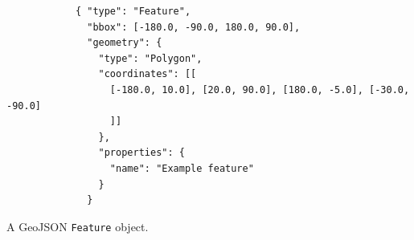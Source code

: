 \begin{listing}[ht]\centering
  \begin{minipage}{.8\textwidth}
    \begin{verbatim}
	        { "type": "Feature",
	          "bbox": [-180.0, -90.0, 180.0, 90.0],
	          "geometry": {
	            "type": "Polygon",
	            "coordinates": [[
	              [-180.0, 10.0], [20.0, 90.0], [180.0, -5.0], [-30.0, -90.0]
	              ]]
	            },
	            "properties": {
	              "name": "Example feature"
	            }
	          }
    \end{verbatim}
  \end{minipage}
  \caption{A GeoJSON \texttt{Feature} object.}\label{lst:geojson2}
\end{listing}




